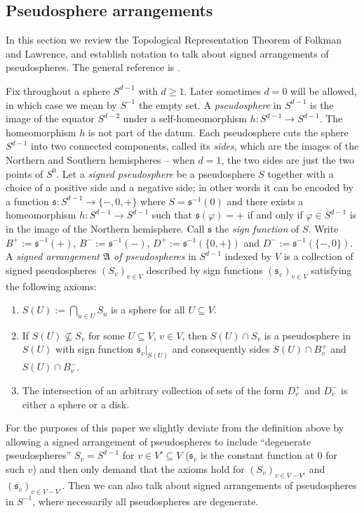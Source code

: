 \documentclass[a4paper,11pt,reqno, english]{amsart}
\theoremstyle{definition}
\theoremstyle{remark}
\begin{document}
\medskip
\subsection{Pseudosphere arrangements}\label{sec:prelim-oms:pseudospheres}
\medskip

In this section we review the Topological Representation Theorem of Folkman and Lawrence, and establish notation to talk about signed arrangements of pseudospheres. The general reference is \cite[Chapter 5]{OrientedMatroids}.

Fix throughout a sphere $S^{d-1}$ with $d\geq 1$. Later sometimes $d=0$ will be allowed, in which case we mean by $S^{-1}$ the empty set. A \emph{pseudosphere} in $S^{d-1}$ is the image of the equator $S^{d-2}$ under a self-homeomorphism $h\colon S^{d-1}\to S^{d-1}$. The homeomorphism $h$ is not part of the datum. Each pseudosphere cuts the sphere $S^{d-1}$ into two connected components, called its \emph{sides}, which are the images of the Northern and Southern hemispheres -- when $d=1$, the two sides are just the two points of $S^0$. Let a \emph{signed pseudosphere} be a pseudosphere $S$ together with a choice of a positive side and a negative side; in other words it can be encoded by a function $\mathfrak{s}\colon S^{d-1}\to\{-,0,+\}$ where $S=\mathfrak{s}^{-1}(0)$ and there exists a homeomorphism $h:S^{d-1}\to S^{d-1}$ such that $\mathfrak{s}(\varphi)=+$ if and only if $\varphi\in S^{d-1}$ is in the image of the Northern hemisphere. Call $\mathfrak{s}$ the \emph{sign function} of $S$. Write $B^+:=\mathfrak{s}^{-1}(+)$, $B^-:=\mathfrak{s}^{-1}(-)$, $D^+:=\mathfrak{s}^{-1}(\{0,+\})$ and $D^-:=\mathfrak{s}^{-1}(\{-,0\})$. A \emph{signed arrangement $\mathfrak{A}$ of pseudospheres} in $S^{d-1}$ indexed by $V$ is a collection of signed pseudospheres $(S_v)_{v\in V}$ described by sign functions $(\mathfrak{s}_v)_{v\in V}$ satisfying the following axioms:
\begin{enumerate}[label=\normalfont{(A\arabic*)}]
    \item $S(U):=\bigcap_{u\in U}S_u$ is a sphere for all $U\subseteq V$.
    \item If $S(U)\nsubseteq S_v$ for some $U\subseteq V$, $v\in V$, then $S(U)\cap S_v$ is a pseudosphere in $S(U)$ with sign function $\mathfrak{s}_v|_{S(U)}$ and consequently sides $S(U)\cap B^+_v$ and $S(U)\cap B^-_v$. 
    \item The intersection of an arbitrary collection of sets of the form $D^+_v$ and $D^-_v$ is either a sphere or a disk.
\end{enumerate}
For the purposes of this paper we slightly deviate from the definition above by allowing a signed arrangement of pseudospheres to include ``degenerate pseudospheres'' $S_v=S^{d-1}$ for $v\in V'\subseteq V$ ($\mathfrak{s}_v$ is the constant function at $0$ for such $v$) and then only demand that the axioms hold for $(S_v)_{v\in V-V'}$ and $(\mathfrak{s}_v)_{v\in V-V'}$. Then we can also talk about signed arrangements of pseudospheres in $S^{-1}$, where necessarily all pseudospheres are degenerate.
\end{document}
